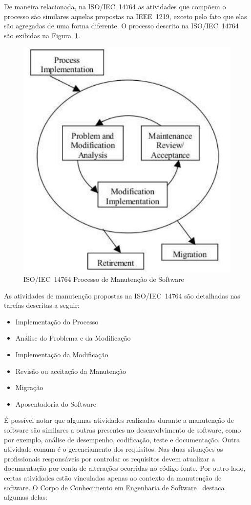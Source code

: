 De maneira relacionada, na ISO/IEC~14764 as atividades que compõem o processo
são similares aquelas propostas na IEEE~1219, exceto pelo fato que elas são
agregadas de uma forma diferente. O processo descrito na ISO/IEC~14764 são
exibidas na Figura~\ref{fig:ieee-14764-processo-manutencao}.

\begin{figure}[htpb] \centering
	\includegraphics[width=0.5\linewidth]
{chapter-manutencao-software-visao-geral/img/ieee-14764-processo-manutencao.pdf}
	\caption{ISO/IEC~14764 Processo de Manutenção de Software}
\label{fig:ieee-14764-processo-manutencao} \end{figure}

As atividades de manutenção propostas na ISO/IEC~14764 são detalhadas nas
tarefas descritas a seguir:

\begin{itemize}
   	\item Implementação do Processo
   	\item Análise do Problema e da Modificação
    \item Implementação da Modificação
	\item Revisão ou aceitação da Manutenção
   	\item Migração
   	\item Aposentadoria do Software
\end{itemize}

É possível notar que algumas atividades realizadas durante a manutenção de
software são similares a outras presentes no desenvolvimento de software, como
por exemplo, análise de desempenho, codificação, teste e documentação. Outra
atividade comum é o gerenciamento dos requisitos. Nas duas situações os
profissionais responsáveis por controlar os requisitos devem atualizar a
do\-cu\-men\-ta\-ção  por conta de alterações ocorridas no código fonte. Por
outro lado, certas atividades estão vinculadas apenas ao contexto da manutenção
de software. O Corpo de Conhecimento em Engenharia de Software~\cite{4425813}
destaca algumas delas:

